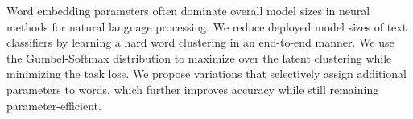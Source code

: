 Word embedding parameters often dominate overall model sizes in neural methods for natural language processing. We reduce deployed model sizes of text classifiers by learning a hard word clustering in an end-to-end manner. We use the Gumbel-Softmax distribution to maximize over the latent clustering while minimizing the task loss. We propose variations that selectively assign additional parameters to words, which further improves accuracy while still remaining parameter-efficient.
